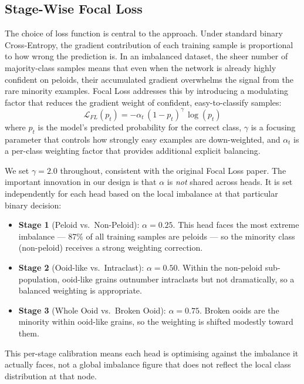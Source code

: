 \documentclass[a4paper,fleqn]{cas-dc}
\begin{document}
\subsection{Stage-Wise Focal Loss}
The choice of loss function is central to the approach. Under standard binary Cross-Entropy, the gradient contribution of each training sample is proportional to how wrong the prediction is. In an imbalanced dataset, the sheer number of majority-class samples means that even when the network is already highly confident on peloids, their accumulated gradient overwhelms the signal from the rare minority examples. Focal Loss \citep{lin2017focal} addresses this by introducing a modulating factor that reduces the gradient weight of confident, easy-to-classify samples:
\begin{equation}
\mathcal{L}_{FL}(p_t) = -\alpha_t\,(1 - p_t)^{\gamma}\,\log(p_t)
\end{equation}
where $p_t$ is the model's predicted probability for the correct class, $\gamma$ is a focusing parameter that controls how strongly easy examples are down-weighted, and $\alpha_t$ is a per-class weighting factor that provides additional explicit balancing.

We set $\gamma = 2.0$ throughout, consistent with the original Focal Loss paper. The important innovation in our design is that $\alpha$ is \textit{not} shared across heads. It is set independently for each head based on the local imbalance at that particular binary decision:
\begin{itemize}
  \item \textbf{Stage 1} (Peloid vs.\ Non-Peloid): $\alpha = 0.25$. This head faces the most extreme imbalance --- 87\% of all training samples are peloids --- so the minority class (non-peloid) receives a strong weighting correction.
  \item \textbf{Stage 2} (Ooid-like vs.\ Intraclast): $\alpha = 0.50$. Within the non-peloid sub-population, ooid-like grains outnumber intraclasts but not dramatically, so a balanced weighting is appropriate.
  \item \textbf{Stage 3} (Whole Ooid vs.\ Broken Ooid): $\alpha = 0.75$. Broken ooids are the minority within ooid-like grains, so the weighting is shifted modestly toward them.
\end{itemize}
This per-stage calibration means each head is optimising against the imbalance it actually faces, not a global imbalance figure that does not reflect the local class distribution at that node.
\end{document}
